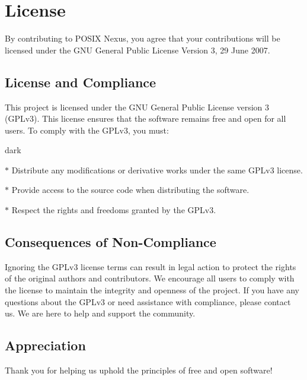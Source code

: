\newpage
\section{License}
By contributing to POSIX Nexus, you agree that your contributions will be licensed under the GNU General Public License Version 3, 29 June 2007.

\subsection{License and Compliance}
This project is licensed under the GNU General Public License version 3 (GPLv3). This license ensures that the software remains free and open for all users.
To comply with the GPLv3, you must:
\begin{baseBoxOne}{}{dark}
    \begin{posnexItemize}
        \item[$\ast$] Distribute any modifications or derivative works under the same GPLv3 license.
        \item[$\ast$] Provide access to the source code when distributing the software.
        \item[$\ast$] Respect the rights and freedoms granted by the GPLv3.
    \end{posnexItemize}
\end{baseBoxOne}

\subsection{Consequences of Non-Compliance}
Ignoring the GPLv3 license terms can result in legal action to protect the rights of the original authors and contributors. We encourage all users to comply with the license to maintain the integrity and openness of the project. If you have any questions about the GPLv3 or need assistance with compliance, please contact us. We are here to help and support the community.

\subsection{Appreciation}
Thank you for helping us uphold the principles of free and open software!